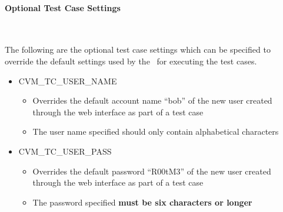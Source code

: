 \paragraph*{Optional Test Case Settings}~\newline

The following are the optional test case settings which can be specified to override
the default settings used by the \cernvmtestframework\ for executing the \cernvmreleasetesting
test cases.

\begin{itemize}
\item	CVM\_TC\_USER\_NAME
		\begin{itemize}
		\item	Overrides the default account name ``bob'' of the new user created 
				through the web interface as part of a \cernvmreleasetesting test case
		\item	The user name specified should only contain alphabetical characters
		\end{itemize}
		
\item	CVM\_TC\_USER\_PASS
		\begin{itemize}
		\item	Overrides the default password ``R00tM3'' of the new user created 
				through the web interface as part of a \cernvmreleasetesting test case
		\item	The password specified {\bf must be six characters or longer}
		\end{itemize}
\end{itemize}